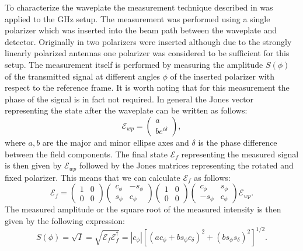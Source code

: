 To characterize the waveplate the measurement technique described in \cite{Masson2006} was applied to the GHz setup. The measurement was performed using a single polarizer which was inserted into the beam path between the waveplate and detector. Originally in \cite{Masson2006} two polarizers were inserted although due to the strongly linearly polarized antennas one polarizer was considered to be sufficient for this setup. The measurement itself is performed by measuring the amplitude $S(\phi)$ of the transmitted signal at different angles $\phi$ of the inserted polarizer with respect to the reference frame. It is worth noting that for this measurement the phase of the signal is in fact not required. In general the Jones vector representing the state after the waveplate can be written as follows:
\begin{equation}
    \bm{\mathcal{E}}_{wp}= 
    \begin{pmatrix}
    a \\
    be^{i\delta}
    \end{pmatrix},
\end{equation}
where $a,b$ are the major and minor ellipse axes and $\delta$ is the phase difference between the field components. The final state $\bm{\mathcal{E}}_{f}$ representing the measured signal is then given by $\bm{\mathcal{E}}_{wp}$ followed by the Jones matrices representing the rotated and fixed polarizer. This means that we can calculate $\bm{\mathcal{E}}_{f}$ as follows:
\begin{equation}
    \bm{\mathcal{E}}_{f}= 
    \begin{pmatrix}
        1 & 0\\
        0 & 0
    \end{pmatrix}
    \begin{pmatrix}
        c_{\phi} & -s_{\phi}\\
        s_{\phi} & c_{\phi}
    \end{pmatrix}
    \begin{pmatrix}
        1 & 0\\
        0 & 0
    \end{pmatrix}
    \begin{pmatrix}
        c_{\phi} & s_{\phi}\\
        -s_{\phi} & c_{\phi}
    \end{pmatrix}
    \bm{\mathcal{E}}_{wp}.
\end{equation}
The measured amplitude or the square root of the measured intensity is then given by the following expression:
\begin{equation}
    S(\phi)=\sqrt{I} = \sqrt{\bm{\mathcal{E}}_{f} \bm{\mathcal{E}}_{f}^{\dagger}} = |c_{\phi}|\left[(ac_{\phi}+bs_{\phi}c_{\delta})^2 + (bs_{\phi}s_{\delta})^2\right]^{1/2}.
    \label{eq:ampl_fit_func}
\end{equation}
